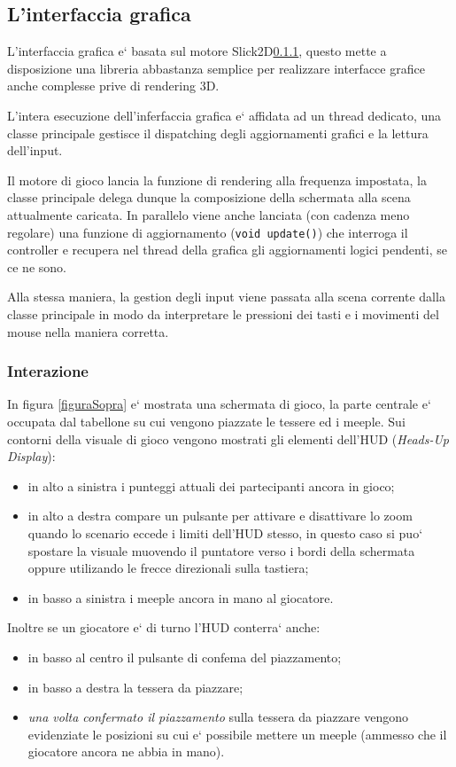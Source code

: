 \subsection{L'interfaccia grafica}
L'interfaccia grafica e` basata sul motore Slick2D\ref{}, %
questo mette a disposizione una libreria abbastanza semplice per realizzare interfacce grafice
anche complesse prive di rendering 3D.

L'intera esecuzione dell'inferfaccia grafica e` affidata ad un thread dedicato, una
classe principale gestisce il dispatching degli aggiornamenti grafici e la lettura
dell'input.

Il motore di gioco lancia la funzione di rendering alla frequenza impostata, la classe principale
delega dunque la composizione della schermata alla scena attualmente caricata.
In parallelo viene anche lanciata (con cadenza meno regolare) una funzione di aggiornamento (\texttt{void update()}) che interroga il controller e recupera nel thread della grafica gli aggiornamenti logici pendenti, se ce ne sono.

Alla stessa maniera, la gestion degli input viene passata alla scena corrente dalla classe principale in modo da interpretare le pressioni dei tasti e i movimenti del mouse nella maniera corretta.

\subsubsection{Interazione}

In figura \ref{figuraSopra} e` mostrata una schermata di gioco, la parte centrale e` occupata dal tabellone su cui vengono piazzate le tessere ed i meeple. 
Sui contorni della visuale di gioco vengono mostrati gli elementi dell'HUD (\emph{Heads-Up Display}): 
\begin{itemize}
\item in alto a sinistra i punteggi attuali dei partecipanti ancora in gioco;
\item in alto a destra compare un pulsante per attivare e disattivare lo zoom quando lo scenario eccede i limiti dell'HUD stesso, in questo caso si puo` spostare la visuale muovendo il puntatore verso i bordi della schermata oppure utilizando le frecce direzionali sulla tastiera;
\item in basso a sinistra i meeple ancora in mano al giocatore.
\end{itemize}
Inoltre se un giocatore e` di turno l'HUD conterra` anche:
\begin{itemize}
\item in basso al centro il pulsante di confema del piazzamento;
\item in basso a destra la tessera da piazzare;
\item \emph{una volta confermato il piazzamento} sulla tessera da piazzare vengono evidenziate le posizioni su cui e` possibile mettere un meeple (ammesso che il giocatore ancora ne abbia in mano).
\end{itemize}

